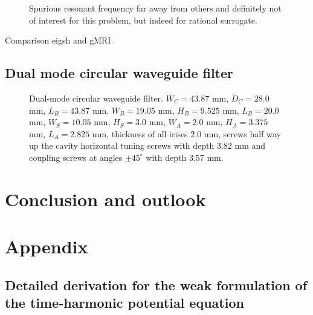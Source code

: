 \documentclass[11pt, a4paper]{article}
\begin{document}
\begin{figure}[ht]
    \centering
    
    \caption{Spurious resonant frequency far away from others and definitely 
    not of interest for this problem, but indeed for rational surrogate.}
    \label{fig:imperfect-conductor-eigfreqs}
\end{figure}

\begin{table}[ht]
    \caption{Comparison eigsh and gMRI.}
    \label{tab:imperfect-conductor-comparison}
    
\end{table}

\subsection{Dual mode circular waveguide filter}
\label{subsec:examples-dmcwf}


\begin{figure}[h]
    \centering
    
    \caption{Dual-mode circular waveguide filter. \cite{DMCWF-Dimensions}
    $W_C=43.87$ mm, $D_C=28.0$ mm, $L_B=43.87$ mm, $W_B=19.05$ mm, $H_B=9.525$ mm,
    $L_B=20.0$ mm, $W_S=10.05$ mm, $H_S=3.0$ mm, $W_A=2.0$ mm, $H_A=3.375$ mm,
    $L_A=2.825$ mm, thickness of all irises $2.0$ mm, screws half way up
    the cavity horizontal tuning screws with depth $3.82$ mm
    and coupling screws at angles $\pm 45^{\circ}$ with depth $3.57$ mm.}
    \label{fig:DMCWF}
\end{figure}





\pagebreak
\section{Conclusion and outlook}
\label{sec:conclusion}

\pagebreak
\section{Appendix}
\label{sec:appendix}

\subsection{Detailed derivation for the weak formulation of the time-harmonic potential equation}
\label{subsec:derivation}
\end{document}
